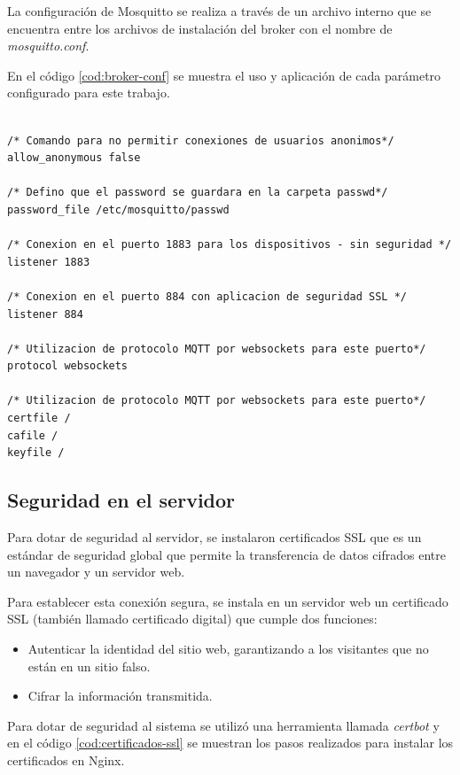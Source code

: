 La configuración de Mosquitto se realiza a través de un archivo interno que se encuentra entre los archivos de instalación del broker con el nombre de \textit{mosquitto.conf}. 

En el código \ref{cod:broker-conf} se muestra el uso y aplicación de cada parámetro configurado para este trabajo. 

\begin{lstlisting}[label=cod:broker-conf,caption=Configuración utilizada en Mosquitto como broker MQTT.] 

/* Comando para no permitir conexiones de usuarios anonimos*/
allow_anonymous false

/* Defino que el password se guardara en la carpeta passwd*/
password_file /etc/mosquitto/passwd

/* Conexion en el puerto 1883 para los dispositivos - sin seguridad */
listener 1883

/* Conexion en el puerto 884 con aplicacion de seguridad SSL */
listener 884

/* Utilizacion de protocolo MQTT por websockets para este puerto*/
protocol websockets

/* Utilizacion de protocolo MQTT por websockets para este puerto*/
certfile /
cafile /
keyfile /

\end{lstlisting}

\subsection{Seguridad en el servidor}

Para dotar de seguridad al servidor, se instalaron certificados SSL que es un estándar de seguridad global que permite la transferencia de datos cifrados entre un navegador y un servidor web.

Para establecer esta conexión segura, se instala en un servidor web un certificado SSL (también llamado certificado digital) que cumple dos funciones:

\begin{itemize}
	\item Autenticar la identidad del sitio web, garantizando a los visitantes que no están en un sitio falso.
	
	\item Cifrar la información transmitida.

\end{itemize}

Para dotar de seguridad al sistema se utilizó una herramienta llamada \textit{certbot} \citep{WEBSITE:40} y en el código \ref{cod:certificados-ssl} se muestran los pasos realizados para instalar los certificados en Nginx.


